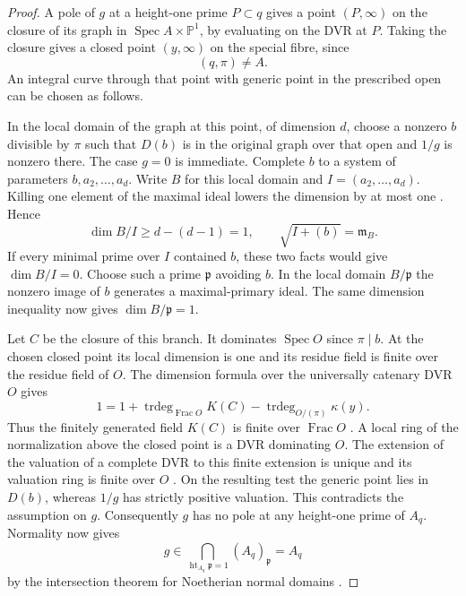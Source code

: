 \begin{proof}
A pole of \(g\) at a height-one prime \(P\subset q\)
gives a point \((P,\infty)\) on the closure of its graph
in \(\operatorname{Spec} A\times\mathbb P^1\), by evaluating
on the DVR at \(P\). Taking the closure gives a closed point
\((y,\infty)\) on the special fibre, since 
\[
  (q,\pi)\ne A.
\]
An integral curve through that point with generic point in
the prescribed open can be chosen as follows.

In the local
domain of the graph at this point, of dimension \(d\), choose
a nonzero \(b\) divisible by \(\pi\) such that \(D(b)\) is in
the original graph over that open and \(1/g\) is nonzero
there. The case \(g=0\) is immediate. Complete \(b\) to a
system of parameters \(b,a_2,\ldots,a_d\). Write \(B\) for this local domain and \(I=(a_2,\ldots,a_d)\).
Killing one element of the maximal ideal lowers the dimension
by at most one \cite{slice-dimension-drop}. Hence
\[
 \dim B/I\ge d-(d-1)=1,\qquad \sqrt{I+(b)}=\mathfrak m_B .
\]
If every minimal prime over \(I\) contained \(b\), these two facts would
give \(\dim B/I=0\). Choose such a prime \(\mathfrak p\) avoiding \(b\).
In the local domain \(B/\mathfrak p\) the nonzero image of \(b\) generates a
maximal-primary ideal. The same dimension inequality now gives
\(\dim B/\mathfrak p=1\).

Let \(C\) be the closure of this branch. It dominates \(\operatorname{Spec} O\)
since \(\pi\mid b\). At the chosen closed point its local dimension is one
and its residue field is finite over the residue field of \(O\).
The dimension formula over the universally catenary DVR \(O\) gives
\[
 1=1+\operatorname{trdeg}_{\operatorname{Frac}O}K(C)
       -\operatorname{trdeg}_{O/(\pi)}\kappa(y).
\]
Thus the finitely generated field \(K(C)\) is finite over
\(\operatorname{Frac} O\) \cite{dim-slice}. A local ring of the
normalization above the closed point is a DVR dominating \(O\).
The extension of the valuation of a complete DVR to this finite
extension is unique and its valuation ring is finite over \(O\)
\cite{dvr-slice}. On the resulting test the generic point lies in
\(D(b)\), whereas \(1/g\) has strictly positive valuation.
This contradicts the assumption on \(g\).
Consequently \(g\) has no pole at any height-one prime of \(A_q\).
Normality now gives
\[
 g\in\bigcap_{\operatorname{ht}_{A_q}\mathfrak p=1}
               (A_q)_{\mathfrak p}=A_q
\]
by the intersection theorem for Noetherian normal domains
\cite{slice-normal-intersection}.\label{cor:slice-metrics-2}

\end{proof}

